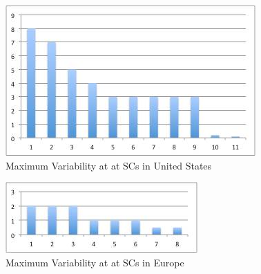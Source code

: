 \begin{figure}
\begin{center}
\includegraphics[scale=0.8]{figs/USVar.jpg}
\caption{Maximum Variability at at SCs in United States}
\label{fig:USvar}
\end{center}
\end{figure}

\begin{figure}
\begin{center}
\includegraphics[scale=0.8]{figs/EUVar.jpg}
\caption{Maximum Variability at at SCs in Europe}
\label{fig:EUvar}
\end{center}
\end{figure}

